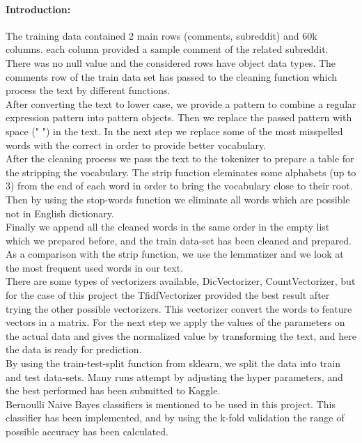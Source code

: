 \documentclass[12pt]{report}
\begin{document}
	\paragraph{Introduction:}
	The training data contained 2 main rows (comments, subreddit) and 60k columns. each column provided a sample comment of the related subreddit.\\
	There was no null value and the considered rows have object data types.
	The comments row of the train data set has passed to the cleaning function which process the text by different functions.\\
	After converting the text to lower case, we provide a pattern to combine a regular expression pattern into pattern objects. Then we replace the passed pattern with space (" ") in the text.
	In the next step we replace some of the most misspelled words with the correct in order to provide better vocabulary.\\
	After the cleaning process we pass the text to the tokenizer to prepare a table for the stripping the vocabulary. The strip function eleminates some alphabets (up to 3) from the end of each word in order to bring the vocabulary close to their root.  
	Then by using the stop-words function we eliminate all words which are possible not in English dictionary. \\
	Finally we append all the cleaned words in the same order in the empty list which we prepared before, and the train data-set has been cleaned and prepared. \\
	As a comparison with the strip function, we use the lemmatizer and we look at the most frequent used words in our text.\\
	There are some types of vectorizers available, DicVectorizer, CountVectorizer, but for the case of this project the TfidfVectorizer provided the best result after trying the other possible vectorizers.
	This vectorizer convert the words to feature vectors in a matrix.
	For the next step we apply the values of the parameters on the actual data and gives the normalized value by transforming the text, and here the data is ready for prediction. \\
	By using the train-test-split function from sklearn, we split the data into train and test data-sets. Many runs attempt by adjusting the hyper parameters, and the best performed has been submitted to Kaggle. \\
	Bernoulli Naive Bayes classifiers is mentioned to be used in this project. This classifier has been implemented, and by using the k-fold validation the range of possible accuracy has been calculated.\\
\end{document}
